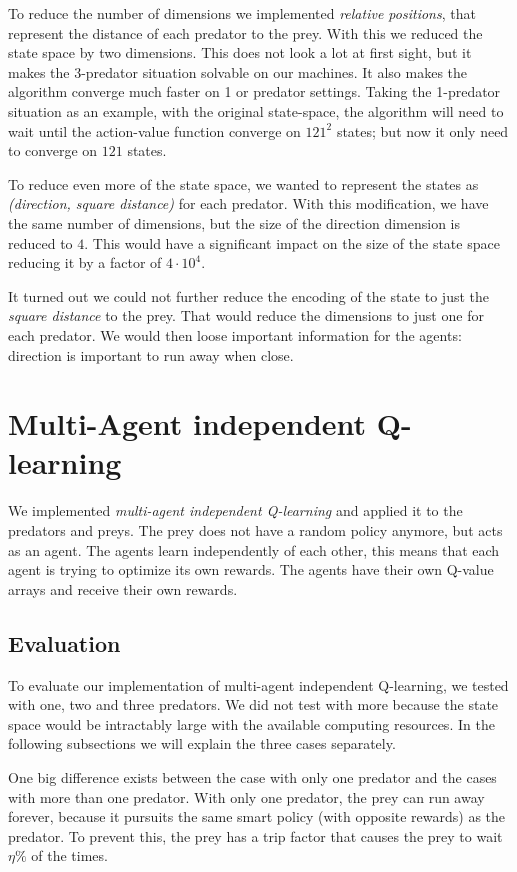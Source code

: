 \documentclass{article}
\begin{document}
To reduce the number of dimensions we implemented \emph{relative positions},
that represent the distance of each predator to the prey. With this we reduced the
state space by two dimensions. This does not look a lot at first sight, but it makes the 3-predator situation solvable on our machines. It also makes the algorithm converge much faster on 1 or predator settings. Taking the 1-predator situation as an example, with the original state-space, the algorithm will need to wait until the action-value function converge on $121^2$ states; but now it only need to converge on $121$ states.

To reduce even more of the state space, we wanted to represent the states as
\emph{(direction, square distance)} for each predator. With this modification, we have the
same number of dimensions, but the size of the direction dimension is reduced to $4$.
This would have a significant impact on the size of the state space reducing it
by a factor of $4\cdot10^4$.

It turned out we could not further reduce the encoding of the state to just the \emph{square distance} to the prey. That
would reduce the dimensions to just one for each predator. We would then loose important information for the agents: direction is important to run away
when close.

\section{Multi-Agent independent Q-learning}
We implemented \emph{multi-agent independent Q-learning} and applied it to the predators and preys. The prey does not have a random policy anymore, but acts as an agent. The agents learn
independently of each other, this means that each agent is trying to optimize
its own rewards. The agents have their own Q-value arrays and receive their own rewards.

\subsection{Evaluation}
To evaluate our implementation of multi-agent independent Q-learning, we tested
with one, two and three predators. We did not test with more because the state
space would be intractably large with the available computing resources. In the
following subsections we will explain the three cases separately.

One big difference exists between the case with only one predator and the cases with
more than one predator. With only one predator, the prey can run away forever, because it pursuits the same smart policy (with opposite rewards) as the predator. To prevent this, the prey has a trip factor that causes the
prey to wait $\eta\%$ of the times.
\end{document}
